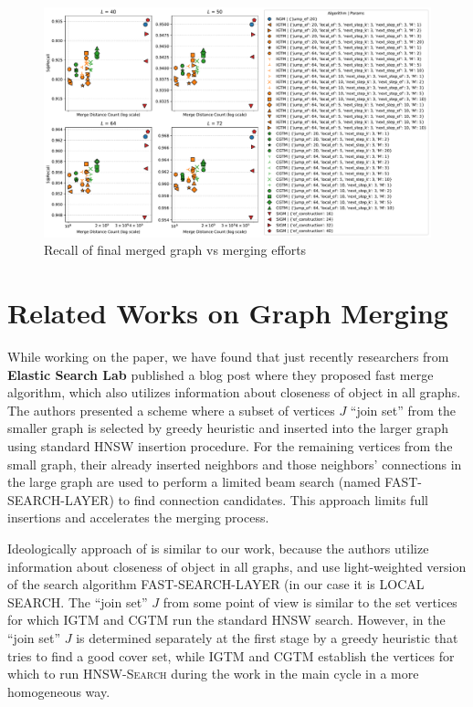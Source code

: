 \documentclass{article}
\begin{document}
\begin{figure}
  \centering
  \includegraphics[width=1.\linewidth]{figs/recall_vs_merge_distance_count.pdf}
  \caption{Recall of final merged graph vs merging efforts}
  \label{fig:recall_vs_merge}
\end{figure}


\section{Related Works on Graph Merging}
\label{sec:relatedworks}
While working on the paper, we have found that just recently researchers from \textbf{Elastic Search Lab} published a blog post \cite{ElasticHNSW2023} where they proposed fast merge algorithm, which also utilizes information about closeness of object in all graphs. The authors presented a scheme where a subset of vertices $J$ ``join set'' from the smaller graph is selected by greedy heuristic and inserted into the larger graph using standard HNSW insertion procedure. For the remaining vertices from the small graph, their already inserted neighbors and those neighbors' connections in the large graph are used to perform a limited beam search (named FAST-SEARCH-LAYER) to find connection candidates. This approach limits full insertions and accelerates the merging process.

Ideologically approach of \cite{ElasticHNSW2023} is similar to our work, because the authors utilize information about closeness of object in all graphs, and use light-weighted version of the search algorithm FAST-SEARCH-LAYER (in our case it is \textsc{LOCAL SEARCH}. The ``join set'' $J$ from some point of view is similar to the set vertices for which \textsc{IGTM} and \textsc{CGTM} run the standard HNSW search. However, in \cite{ElasticHNSW2023} the ``join set'' $J$ is determined separately at the first stage by a greedy heuristic that tries to find a good cover set, while \textsc{IGTM} and \textsc{CGTM} establish the vertices for which to run \textsc{HNSW-Search} during the work in the main cycle in a more homogeneous way. 
\end{document}
